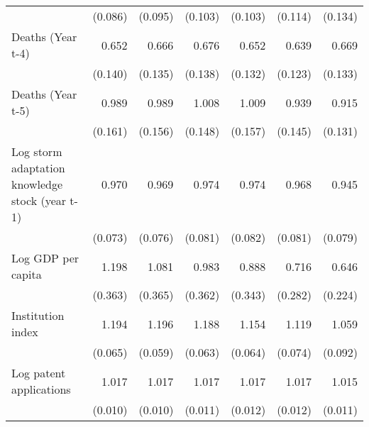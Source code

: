 \begin{table}[htbp]
\begin{tabular}{l*{6}{D{.}{.}{-1}}}
                    &     (0.086)         &     (0.095)         &     (0.103)         &     (0.103)         &     (0.114)         &     (0.134)         \\
\addlinespace
Deaths (Year t-4)   &       0.652\sym{**} &       0.666\sym{**} &       0.676\sym{*}  &       0.652\sym{**} &       0.639\sym{**} &       0.669\sym{**} \\
                    &     (0.140)         &     (0.135)         &     (0.138)         &     (0.132)         &     (0.123)         &     (0.133)         \\
\addlinespace
Deaths (Year t-5)   &       0.989         &       0.989         &       1.008         &       1.009         &       0.939         &       0.915         \\
                    &     (0.161)         &     (0.156)         &     (0.148)         &     (0.157)         &     (0.145)         &     (0.131)         \\
\addlinespace
Log storm adaptation knowledge stock (year t-1)&       0.970         &       0.969         &       0.974         &       0.974         &       0.968         &       0.945         \\
                    &     (0.073)         &     (0.076)         &     (0.081)         &     (0.082)         &     (0.081)         &     (0.079)         \\
\addlinespace
Log GDP per capita  &       1.198         &       1.081         &       0.983         &       0.888         &       0.716         &       0.646         \\
                    &     (0.363)         &     (0.365)         &     (0.362)         &     (0.343)         &     (0.282)         &     (0.224)         \\
\addlinespace
Institution index   &       1.194\sym{***}&       1.196\sym{***}&       1.188\sym{***}&       1.154\sym{**} &       1.119\sym{*}  &       1.059         \\
                    &     (0.065)         &     (0.059)         &     (0.063)         &     (0.064)         &     (0.074)         &     (0.092)         \\
\addlinespace
Log patent applications&       1.017         &       1.017         &       1.017         &       1.017         &       1.017         &       1.015         \\
                    &     (0.010)         &     (0.010)         &     (0.011)         &     (0.012)         &     (0.012)         &     (0.011)         \\

\end{tabular}
\end{table}
